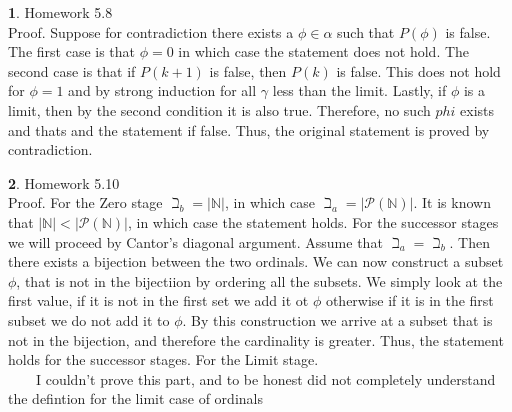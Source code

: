 \documentclass[10pt, twocolumn]{article}
\theoremstyle{definition}
\newtheorem{q}{}
\begin{document}
\begin{q}
Homework 5.8 \\
Proof. Suppose for contradiction there exists a $ \phi \in \alpha $ such that $ P(\phi) $ is false. 
The first case is that $ \phi = 0 $ in which case the statement does not hold.
The second case is that if $ P(k+1) $ is false, then $ P(k) $ is false. This does not hold for $ \phi = 1 $
and by strong induction for all $ \gamma $ less than the limit.
Lastly, if $ \phi $ is a limit, then by the second condition it is also true. 
Therefore, no such $ phi $ exists and thats and the statement if false.
Thus, the original statement is proved by contradiction.
\end{q}
\begin{q}
	Homework 5.10 \\	
	Proof. For the Zero stage $ \beth_b = | \mathbb{N} | $,
	in which case $ \beth_a = | \mathcal P(\mathbb{N}) | $. 
	It is known that $ | \mathbb{N} | <  | \mathcal P(\mathbb{N}) |$, in which case the statement holds.
	For the successor stages we will proceed by Cantor's diagonal argument.
	Assume that $ \beth_a = \beth_b $.
	Then there exists a bijection between the two ordinals. 
	We can now construct a subset $ \phi $, that is not in the bijectiion by ordering all the subsets. 
	We simply look at the first value, if it is not in the first set we add it ot $ \phi $ otherwise if it is in the first subset we do not add it to $ \phi $. 
	By this construction we arrive at a subset that is not in the bijection, and therefore the cardinality is greater. 
	Thus, the statement holds for the successor stages.
	For the Limit stage. \\ 

	~~~~I couldn't prove this part, and to be honest did not completely understand the defintion for the limit case of ordinals ~~~~
\end{q}
\end{document}
